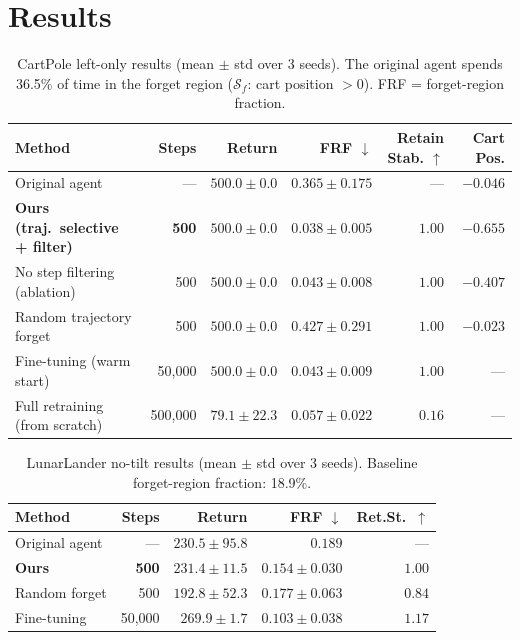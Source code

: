 \documentclass[sigconf]{acmart}
\begin{document}
\section{Results}

\begin{table}[t]
\caption{CartPole left-only results (mean $\pm$ std over 3 seeds). The original agent spends 36.5\% of time in the forget region ($\mathcal{S}_f$: cart position $> 0$). FRF = forget-region fraction.}
\label{tab:results}
\begin{tabular}{lrrrrr}
\toprule
\textbf{Method} & \textbf{Steps} & \textbf{Return} & \textbf{FRF $\downarrow$} & \textbf{Retain Stab. $\uparrow$} & \textbf{Cart Pos.} \\
\midrule
Original agent & --- & $500.0 \pm 0.0$ & $0.365 \pm 0.175$ & --- & $-0.046$ \\
\midrule
\textbf{Ours (traj.\ selective + filter)} & \textbf{500} & $\mathbf{500.0 \pm 0.0}$ & $\mathbf{0.038 \pm 0.005}$ & $\mathbf{1.00}$ & $\mathbf{-0.655}$ \\
No step filtering (ablation) & 500 & $500.0 \pm 0.0$ & $0.043 \pm 0.008$ & $1.00$ & $-0.407$ \\
Random trajectory forget & 500 & $500.0 \pm 0.0$ & $0.427 \pm 0.291$ & $1.00$ & $-0.023$ \\
Fine-tuning (warm start) & 50{,}000 & $500.0 \pm 0.0$ & $0.043 \pm 0.009$ & $1.00$ & --- \\
Full retraining (from scratch) & 500{,}000 & $79.1 \pm 22.3$ & $0.057 \pm 0.022$ & $0.16$ & --- \\
\bottomrule
\end{tabular}
\end{table}

\begin{table}[t]
\caption{LunarLander no-tilt results (mean $\pm$ std over 3 seeds). Baseline forget-region fraction: 18.9\%.}
\label{tab:lunarlander}
\small
\begin{tabular}{lrrrr}
\toprule
\textbf{Method} & \textbf{Steps} & \textbf{Return} & \textbf{FRF $\downarrow$} & \textbf{Ret.St.\ $\uparrow$} \\
\midrule
Original agent & --- & $230.5 \pm 95.8$ & $0.189$ & --- \\
\midrule
\textbf{Ours} & \textbf{500} & $\mathbf{231.4 \pm 11.5}$ & $\mathbf{0.154 \pm 0.030}$ & $\mathbf{1.00}$ \\
Random forget & 500 & $192.8 \pm 52.3$ & $0.177 \pm 0.063$ & $0.84$ \\
Fine-tuning & 50{,}000 & $269.9 \pm 1.7$ & $0.103 \pm 0.038$ & $1.17$ \\
\bottomrule
\end{tabular}
\end{table}
\end{document}
